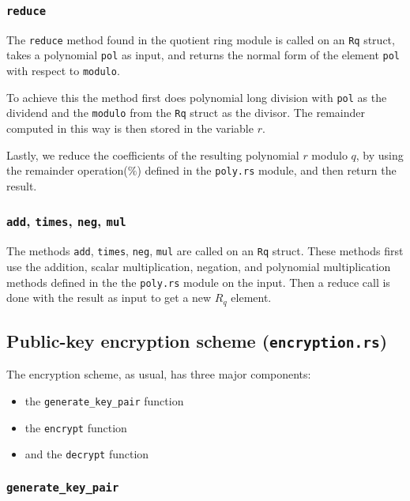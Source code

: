 \documentclass[../main.tex]{subfiles}
\begin{document}
\subsubsection{\lstinline{reduce}}

The \lstinline{reduce} method found in the quotient ring module is called on an \lstinline{Rq} struct, takes a polynomial \lstinline{pol} as input, and returns the normal form of the element \lstinline{pol} with respect to \lstinline{modulo}.

To achieve this the method first does polynomial long division with \lstinline{pol} as the dividend and the \lstinline{modulo} from the \lstinline{Rq} struct as the divisor. The remainder computed in this way is then stored in the variable $r$.

Lastly, we reduce the coefficients of the resulting polynomial $r$ modulo $q$, by using the remainder operation($\%$) defined in the \lstinline{poly.rs} module, and then return the result.

\subsubsection{\lstinline{add}, \lstinline{times}, \lstinline{neg}, \lstinline{mul}}

The methods \lstinline{add}, \lstinline{times}, \lstinline{neg}, \lstinline{mul} are called on an \lstinline{Rq} struct. These methods first use the addition, scalar multiplication, negation, and polynomial multiplication methods defined in the the \lstinline{poly.rs} module on the input. Then a reduce call is done with the result as input to get a new $R_q$ element.

\subsection{Public-key encryption scheme (\lstinline{encryption.rs})}

The encryption scheme, as usual, has three major components:

\begin{itemize}
  \item the \lstinline{generate_key_pair} function
  \item the \lstinline{encrypt} function
  \item and the \lstinline{decrypt} function
\end{itemize}

\subsubsection{\lstinline{generate_key_pair}}
\end{document}
